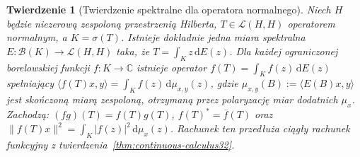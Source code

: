 \documentclass[11pt,a4paper]{article}
\numberwithin{equation}{section}
\theoremstyle{plain}
\newtheorem{twierdzenie}{Twierdzenie}[section]
\theoremstyle{definition}
\theoremstyle{remark}
\newcommand{\C}{\mathbb C}
\begin{document}
\begin{twierdzenie}[Twierdzenie spektralne dla operatora normalnego]
\label{thm:spectral-normal32}
Niech $H$ będzie niezerową zespoloną przestrzenią Hilberta,
$T\in\mathcal L(H,H)$ operatorem normalnym, a $K=\sigma(T)$.
Istnieje dokładnie jedna miara spektralna
$E:\mathcal B(K)\to\mathcal L(H,H)$ taka, że
$T=\int_Kz\,\mathrm dE(z)$.
Dla każdej ograniczonej borelowskiej funkcji $f:K\to\C$
istnieje operator $f(T)=\int_K f(z)\,\mathrm dE(z)$ spełniający
$\langle f(T)x,y\rangle=\int_K f(z)\,\mathrm d\mu_{x,y}(z)$,
gdzie $\mu_{x,y}(B):=\langle E(B)x,y\rangle$
jest skończoną miarą zespoloną, otrzymaną przez
polaryzację miar dodatnich $\mu_x$.
Zachodzą: $(fg)(T)=f(T)g(T)$,
$f(T)^*=\overline f(T)$ oraz
$\|f(T)x\|^2=\int_K|f(z)|^2\,\mathrm d\mu_x(z)$.
Rachunek ten przedłuża ciągły rachunek funkcyjny z
twierdzenia~\ref{thm:continuous-calculus32}.
\end{twierdzenie}
\end{document}
